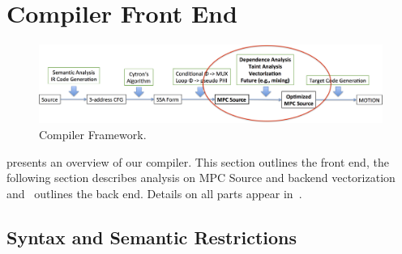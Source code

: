 

\section{\bf Compiler Front End}
\label{sec:compiler}



\begin{figure}
  \includegraphics[width=0.9\linewidth]{figs_paper_SIMD/compiler_framework.png}
  \caption{Compiler Framework.}
  \label{fig:compiler_framework}
\end{figure}

 presents an overview of our compiler.
This section outlines the front end, the following section describes analysis on MPC Source and backend vectorization 
and~ outlines the back end. 
Details on all parts appear in~\cite{Anon_TR}.

\subsection{Syntax and Semantic Restrictions}
\label{sec:syntax}

